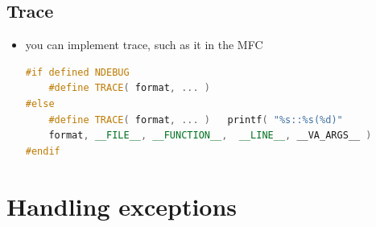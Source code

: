\documentclass[a4paper,11pt,twoside]{book}
\begin{document}
\subsection{Trace}
\begin{itemize}
	\item you can implement trace, such as it in the MFC
\begin{lstlisting}[frame=single, language=c++]
#if defined NDEBUG
	#define TRACE( format, ... )
#else
	#define TRACE( format, ... )   printf( "%s::%s(%d)"
	format, __FILE__, __FUNCTION__,  __LINE__, __VA_ARGS__ )
#endif
	\end{lstlisting}
	
\end{itemize}

\section{Handling exceptions}
\end{document}
